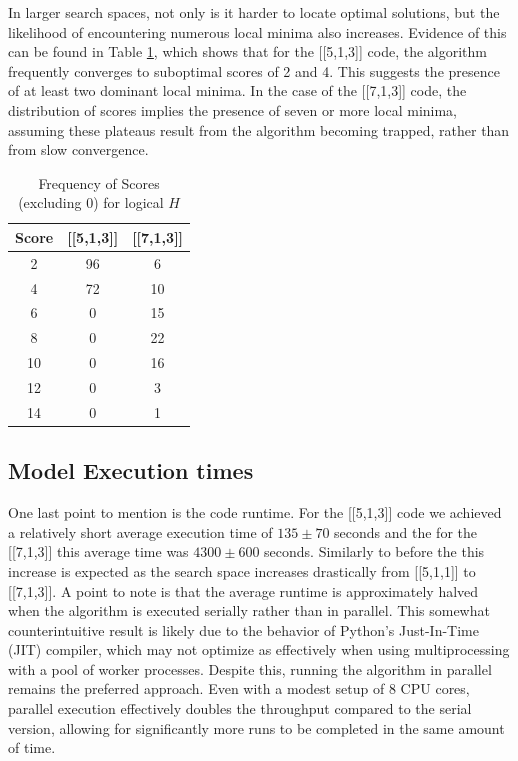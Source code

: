 In larger search spaces, not only is it harder to locate optimal solutions, but the likelihood of encountering numerous local minima also increases. Evidence of this can be found in Table \ref{tab:frequancy table of scores}, which shows that for the [[5,1,3]] code, the algorithm frequently converges to suboptimal scores of 2 and 4. This suggests the presence of at least two dominant local minima. In the case of the [[7,1,3]] code, the distribution of scores implies the presence of seven or more local minima, assuming these plateaus result from the algorithm becoming trapped, rather than from slow convergence. 

\begin{table}[h!]
\centering
\caption{Frequency of Scores (excluding 0) for logical \(H\)}
\label{tab:frequancy table of scores}
\begin{tabular}{ccc}
\toprule
\textbf{Score} & \textbf{[[5,1,3]]} & \textbf{[[7,1,3]]} \\
\midrule
2 & 96 & 6 \\
4 & 72 & 10 \\
6 & 0 & 15 \\
8 & 0 & 22 \\
10 & 0 & 16 \\
12 & 0 & 3 \\
14 & 0 & 1 \\
\bottomrule
\end{tabular}
\end{table}

\subsection{Model Execution times}
One last point to mention is the code runtime. For the [[5,1,3]] code we achieved a relatively short average execution time of \(135\pm 70\) seconds and the for the [[7,1,3]] this average time was \(4300\pm 600\) seconds. Similarly to before the this increase is expected as the search space increases drastically from [[5,1,1]] to [[7,1,3]]. A point to note is that the average runtime is approximately halved when the algorithm is executed serially rather than in parallel. This somewhat counterintuitive result is likely due to the behavior of Python's Just-In-Time (JIT) compiler, which may not optimize as effectively when using multiprocessing with a pool of worker processes. Despite this, running the algorithm in parallel remains the preferred approach. Even with a modest setup of 8 CPU cores, parallel execution effectively doubles the throughput compared to the serial version, allowing for significantly more runs to be completed in the same amount of time.

